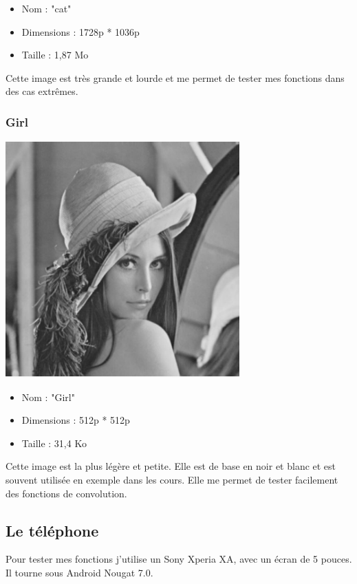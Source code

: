 \documentclass{article}
\begin{document}
\begin{itemize}
\item Nom : "cat"
\item Dimensions : 1728p * 1036p
\item Taille : 1,87 Mo
\end{itemize}
\medbreak

Cette image est très grande et lourde et me permet de tester mes fonctions dans des cas extrêmes.

\subsubsection{Girl}
\begin{center} 
    \includegraphics[width=9cm]{../Image_fonctions/Lenna/Base.PNG}
\end{center}
\bigbreak

\begin{itemize}
\item Nom : "Girl"
\item Dimensions : 512p * 512p
\item Taille : 31,4 Ko
\end{itemize}
\medbreak

Cette image est la plus légère et petite. Elle est de base en noir et blanc et est souvent utilisée en exemple dans les cours.
Elle me permet de tester facilement des fonctions de convolution.

\subsection{Le téléphone}
Pour tester mes fonctions j'utilise un Sony Xperia XA, avec un écran de 5 pouces.
Il tourne sous Android Nougat 7.0.
\end{document}
